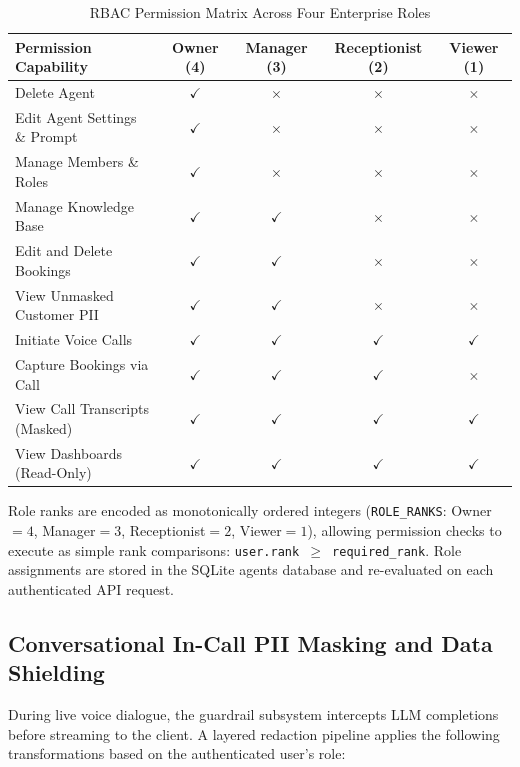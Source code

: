 \documentclass[11pt,a4paper]{article}
\begin{document}
\begin{table}[htbp]
\centering
\small
\caption{RBAC Permission Matrix Across Four Enterprise Roles}
\label{tab:rbac_matrix}
\renewcommand{\arraystretch}{1.3}
\begin{tabularx}{\textwidth}{lcccc}
\toprule
\textbf{Permission Capability} & \textbf{Owner (4)} & \textbf{Manager (3)} & \textbf{Receptionist (2)} & \textbf{Viewer (1)} \\
\midrule
Delete Agent & $\checkmark$ & $\times$ & $\times$ & $\times$ \\
Edit Agent Settings \& Prompt & $\checkmark$ & $\times$ & $\times$ & $\times$ \\
Manage Members \& Roles & $\checkmark$ & $\times$ & $\times$ & $\times$ \\
Manage Knowledge Base & $\checkmark$ & $\checkmark$ & $\times$ & $\times$ \\
Edit and Delete Bookings & $\checkmark$ & $\checkmark$ & $\times$ & $\times$ \\
View Unmasked Customer PII & $\checkmark$ & $\checkmark$ & $\times$ & $\times$ \\
Initiate Voice Calls & $\checkmark$ & $\checkmark$ & $\checkmark$ & $\checkmark$ \\
Capture Bookings via Call & $\checkmark$ & $\checkmark$ & $\checkmark$ & $\times$ \\
View Call Transcripts (Masked) & $\checkmark$ & $\checkmark$ & $\checkmark$ & $\checkmark$ \\
View Dashboards (Read-Only) & $\checkmark$ & $\checkmark$ & $\checkmark$ & $\checkmark$ \\
\bottomrule
\end{tabularx}
\end{table}

Role ranks are encoded as monotonically ordered integers (\texttt{ROLE\_RANKS}: Owner$=4$, Manager$=3$, Receptionist$=2$, Viewer$=1$), allowing permission checks to execute as simple rank comparisons: \texttt{user.rank $\ge$ required\_rank}. Role assignments are stored in the SQLite agents database and re-evaluated on each authenticated API request.

\subsection{Conversational In-Call PII Masking and Data Shielding}
\label{subsec:pii}

During live voice dialogue, the guardrail subsystem intercepts LLM completions before streaming to the client. A layered redaction pipeline applies the following transformations based on the authenticated user's role:
\end{document}

